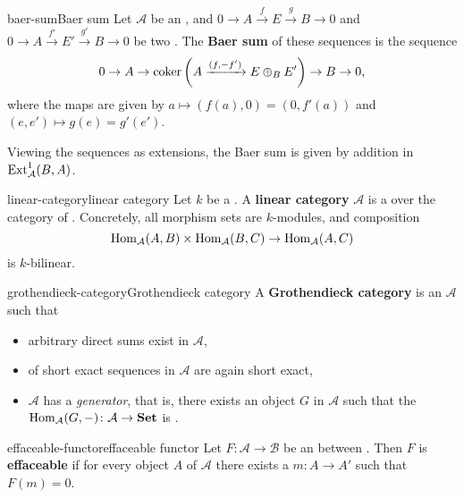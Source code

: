 \begin{topic}{baer-sum}{Baer sum}
    Let $\mathcal{A}$ be an , and $0 \to A \xrightarrow{f} E \xrightarrow{g} B \to 0$ and $0 \to A \xrightarrow{f'} E' \xrightarrow{g'} B \to 0$ be two . The \textbf{Baer sum} of these sequences is the sequence
    \[ 0 \to A \to \operatorname{coker} \left(A \xrightarrow{(f, -f')} E \oplus_B E'\right) \to B \to 0 , \]
    where the maps are given by $a \mapsto (f(a), 0) = (0, f'(a))$ and $(e, e') \mapsto g(e) = g'(e')$.
    
    Viewing the sequences as extensions, the Baer sum is given by addition in $\textup{Ext}_\mathcal{A}^1(B, A)$.
\end{topic}

\begin{topic}{linear-category}{linear category}
    Let $k$ be a . A \textbf{linear category} $\mathcal{A}$ is a   over the category of . Concretely, all morphism sets are $k$-modules, and composition
    \[ \operatorname{Hom}_\mathcal{A}(A, B) \times \operatorname{Hom}_\mathcal{A}(B, C) \to \operatorname{Hom}_\mathcal{A}(A, C) \]
    is $k$-bilinear.
\end{topic}

\begin{topic}{grothendieck-category}{Grothendieck category}
    A \textbf{Grothendieck category} is an  $\mathcal{A}$ such that
    \begin{itemize}
        \item arbitrary direct sums exist in $\mathcal{A}$,
        \item {} of short exact sequences in $\mathcal{A}$ are again short exact,
        \item $\mathcal{A}$ has a \textit{generator}, that is, there exists an object $G$ in $\mathcal{A}$ such that the  $\operatorname{Hom}_\mathcal{A}(G, -) \colon \mathcal{A} \to \textbf{Set}$ is .
    \end{itemize}
\end{topic}

\begin{topic}{effaceable-functor}{effaceable functor}
    Let $F \colon \mathcal{A} \to \mathcal{B}$ be an  between . Then $F$ is \textbf{effaceable} if for every object $A$ of $\mathcal{A}$ there exists a  $m \colon A \to A'$ such that $F(m) = 0$.
\end{topic}


